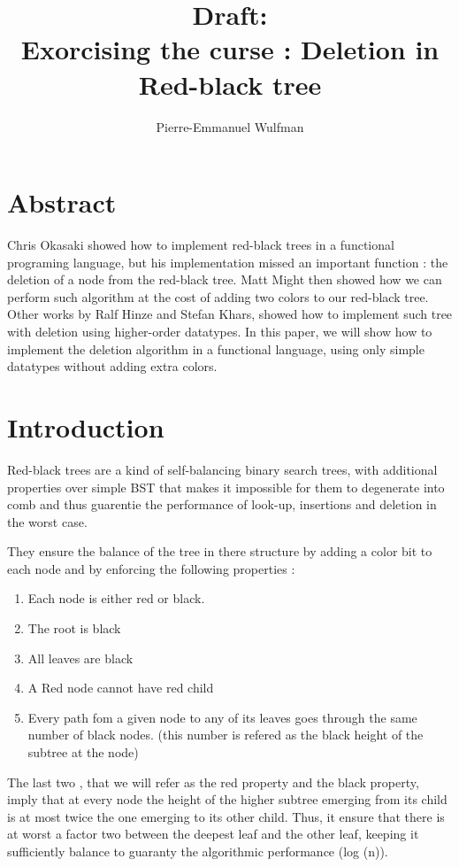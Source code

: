 \documentclass[10pt,a4paper]{article}
\title{Draft:\\ Exorcising the curse : Deletion in Red-black tree}
\author{Pierre-Emmanuel Wulfman}
\begin{document}
\maketitle

\section*{Abstract}

Chris Okasaki showed how to implement red-black trees in a functional programing language, but his implementation missed an important function : the deletion of a node from the red-black tree.
Matt Might then showed how we can perform such algorithm at the cost of adding two colors to our red-black tree.
Other works by Ralf Hinze and Stefan Khars, showed how to implement such tree with deletion using higher-order datatypes.
In this paper, we will show how to implement the deletion algorithm in a functional language, using only simple datatypes without adding extra colors.

\section{Introduction}

Red-black trees are a kind of self-balancing binary search trees, with additional properties over simple BST that makes it impossible for them to degenerate into comb and thus guarentie the performance of look-up, insertions and deletion in the worst case.

They ensure the balance of the tree in there structure by adding a color bit to each node and by enforcing the following properties :
\begin{enumerate}
\item Each node is either red or black.
\item The root is black
\item All leaves are black
\item A Red node cannot have red child
\item Every path fom a given node to any of its leaves goes through the same number of black nodes. (this number is refered as the black height of the subtree at the node)
\end{enumerate}

The last two , that we will refer as the red property and the black property, imply that at every node the height of the higher subtree emerging from its child is at most twice the one emerging to its other child. Thus, it ensure that there is at worst a factor two between the deepest leaf and the other leaf, keeping it sufficiently balance to guaranty the algorithmic performance (log (n)).
\end{document}
